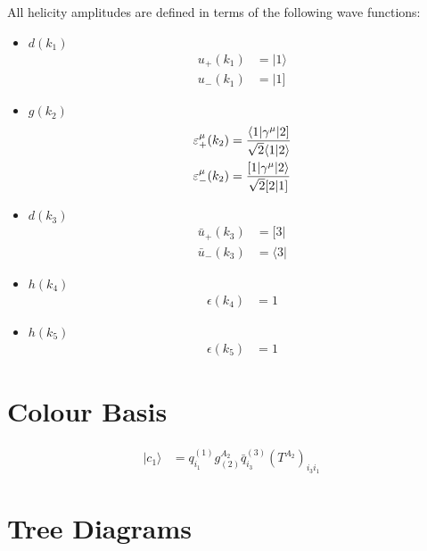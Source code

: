 \documentclass[a4paper]{article}
\newcommand{\bra}[1]{\langle #1 \vert}
\newcommand{\brb}[1]{[ #1 \vert}
\newcommand{\kea}[1]{\vert #1 \rangle}
\newcommand{\keb}[1]{\vert #1 ]}
\newcommand{\Spaa}[1]{\langle #1 \rangle}
\newcommand{\Spab}[1]{\langle #1]}
\newcommand{\Spba}[1]{[ #1 \rangle}
\newcommand{\Spbb}[1]{[ #1 ]}
\begin{document}
All helicity amplitudes are defined in terms of the following wave functions:
\begin{itemize}
\item $d(k_{1})$ 
\begin{align}
u_+(k_{1}) &= \kea{1}\\
u_-(k_{1}) &= \keb{1}
\end{align}
\item $g(k_{2})$ 
\begin{align}
\varepsilon^\mu_+(k_{2}) &=
   \frac{\Spab{1\vert\gamma^\mu\vert 2}}{%
   \sqrt{2}\Spaa{1\vert 2}}\\
\varepsilon^\mu_-(k_{2}) &=
   \frac{\Spba{1\vert\gamma^\mu\vert 2}}{%
   \sqrt{2}\Spbb{2\vert 1}}
\end{align}
\item $d(k_3)$ 
\begin{align}
\bar{u}_+(k_{3}) &= \brb{3}\\
\bar{u}_-(k_{3}) &= \bra{3}
\end{align}
\item $h(k_4)$ 
\begin{align}
\epsilon(k_{4}) &= 1
\end{align}
\item $h(k_5)$ 
\begin{align}
\epsilon(k_{5}) &= 1
\end{align}
\end{itemize}

\section{Colour Basis}
\begin{align}
\vert c_{1}\rangle &=q_{i_{1}}^{(1)}g^{A_{2}}_{(2)}\bar{q}_{i_{3}}^{(3)}\left(T^{A_{2}}\right)_{i_{3}i_{1}}
\end{align}


\section{Tree Diagrams}

\end{document}
